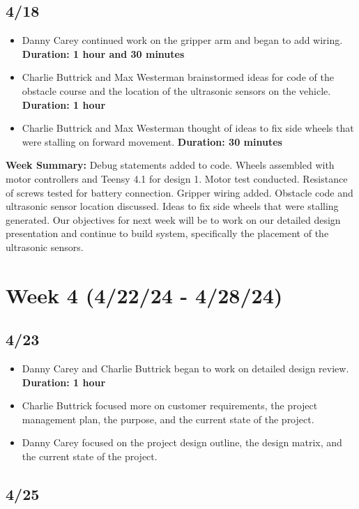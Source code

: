 \documentclass[11pt]{report}
\begin{document}
\subsection*{4/18}

\begin{itemize}
    \item Danny Carey continued work on the gripper arm and began to add wiring. \textbf{Duration: 1 hour and 30 minutes}
    \item Charlie Buttrick and Max Westerman brainstormed ideas for code of the obstacle course and the location of the ultrasonic sensors on the vehicle. \textbf{Duration: 1 hour}
    \item Charlie Buttrick and Max Westerman thought of ideas to fix side wheels that were stalling on forward movement. \textbf{Duration: 30 minutes}
\end{itemize}

\textbf{Week Summary:} Debug statements added to code. Wheels assembled with motor controllers and Teensy 4.1 for design 1. Motor test conducted. Resistance of screws tested for battery connection. Gripper wiring added. Obstacle code and ultrasonic sensor location discussed. Ideas to fix side wheels that were stalling generated. Our objectives for next week will be to work on our detailed design presentation and continue to build system, specifically the placement of the ultrasonic sensors.

\section{Week 4 (4/22/24 - 4/28/24)}
\subsection*{4/23}

\begin{itemize}
    \item Danny Carey and Charlie Buttrick began to work on detailed design review. \textbf{Duration: 1 hour}
    \item Charlie Buttrick focused more on customer requirements, the project management plan, the purpose, and the current state of the project.
    \item Danny Carey focused on the project design outline, the design matrix, and the current state of the project.
\end{itemize}

\subsection*{4/25}
\end{document}
